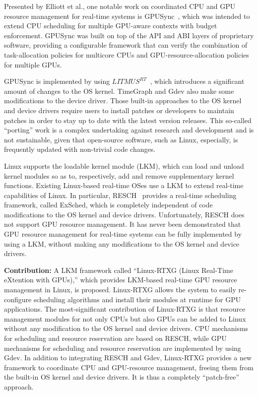 Presented by Elliott et al., one notable work on coordinated CPU and GPU resource management for real-time systems is GPUSync~\cite{elliott:gpusync13,elliott:explor14}, which was intended to extend CPU scheduling for multiple GPU-aware contexts with budget enforcement. GPUSync was built on top of the API and ABI layers of proprietary software, providing a configurable framework that can verify the combination of task-allocation policies for multicore CPUs and GPU-resource-allocation policies for multiple GPUs.

GPUSync is implemented by using $LITMUS^{RT}$~\cite{litmus}, which introduces a significant amount of changes to the OS kernel. TimeGraph and Gdev also make some modifications to the device driver. Those built-in approaches to the OS kernel and device drivers require users to install patches or developers to maintain patches in order to stay up to date with the latest version releases. This so-called ``porting'' work is a complex undertaking against research and development and is not sustainable, given that open-source software, such as Linux, especially, is frequently updated with non-trivial code changes.

Linux supports the loadable kernel module (LKM), which can load and unload kernel modules so as to, respectively, add and remove supplementary kernel functions. Existing Linux-based real-time OSes use a LKM to extend real-time capabilities of Linux. In particular, RESCH~\cite{kato2009loadable, asberg2012exsched} provides a real-time scheduling framework, called ExSched, which is completely independent of code modifications to the OS kernel and device drivers. Unfortunately, RESCH does not support GPU resource management. It has never been demonstrated that GPU resource management for real-time systems can be fully implemented by using a LKM, without making any modifications to the OS kernel and device drivers.

\textbf{Contribution:} A LKM framework called ``Linux-RTXG (Linux Real-Time eXtention with GPUs),'' which provides LKM-based real-time GPU resource management in Linux, is proposed. Linux-RTXG allows the system to easily re-configure scheduling algorithms and install their modules at runtime for GPU applications. The most-significant contribution of Linux-RTXG is that resource management modules for not only CPUs but also GPUs can be added to Linux without any modification to the OS kernel and device drivers. CPU mechanisms for scheduling and resource reservation are based on RESCH, while GPU mechanisms for scheduling and resource reservation are implemented by using Gdev. In addition to integrating RESCH and Gdev, Linux-RTXG provides a new framework to coordinate CPU and GPU-resource management, freeing them from the built-in OS kernel and device drivers. It is thus a completely ``patch-free'' approach.

